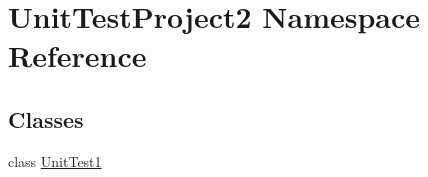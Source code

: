 \hypertarget{namespace_unit_test_project2}{}\section{Unit\+Test\+Project2 Namespace Reference}
\label{namespace_unit_test_project2}
\subsection*{Classes}
\begin{DoxyCompactItemize}
\item 
class \hyperlink{class_unit_test_project2_1_1_unit_test1}{Unit\+Test1}
\end{DoxyCompactItemize}
